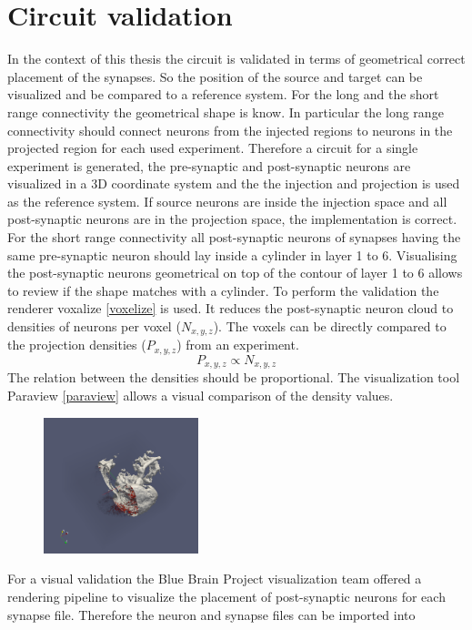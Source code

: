 \newpage
\section{Circuit validation}
In the context of this thesis the circuit is validated in terms of geometrical correct placement of
the synapses. So the position of the source and target can be visualized and be compared to a 
reference system. For the long and the short range connectivity the geometrical shape is know.
In particular the long range connectivity should connect neurons from the injected regions to neurons
in the projected region for each used experiment. Therefore a circuit for a single experiment is 
generated, the pre-synaptic and post-synaptic neurons are visualized in a 3D coordinate system and the the injection
and projection is used as the reference system. If source neurons are inside the injection space and all
post-synaptic neurons are in the projection space, the implementation is correct.
For the short range connectivity all post-synaptic neurons of synapses having the same pre-synaptic neuron should
lay inside a cylinder in layer 1 to 6. Visualising the post-synaptic neurons geometrical on top of the contour of layer 1 to 6 allows to review if the shape matches with a cylinder.
To perform the validation the renderer voxalize \ref{voxelize} is used.
It reduces the post-synaptic neuron cloud to densities of neurons per voxel ($N_{x,y,z}$).
The voxels can be directly compared to the projection densities ($P_{x,y,z}$) from an experiment.
\begin{equation}
	P_{x,y,z} \propto N_{x,y,z}
\end{equation}
The relation between the densities should be proportional.
The visualization tool Paraview \ref{paraview} allows a visual comparison of the density values.
 \begin{figure}[ht!]
\centering
\includegraphics[width=0.4\textwidth]{pictures/paraview_ex.png}
\end{figure}
For a visual validation the Blue Brain Project visualization team offered a rendering pipeline to visualize the placement of post-synaptic neurons for each synapse file. Therefore the neuron and synapse files can be imported into 

